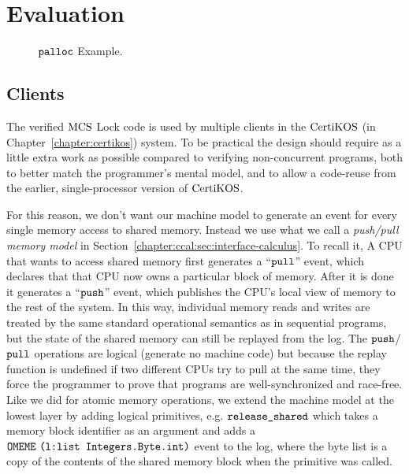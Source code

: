 
\section{Evaluation}
\label{chapter:mcslock:sec:evaluation}

\begin{figure}
\begin{minipage}{\linewidth}
\noindent
\begin{multicols}{2}


\end{multicols}
\end{minipage}
\caption{${\mathrm{\texttt{palloc}}}$ Example.}
\label{fig:chapter:mcslock:palloc-example}
\end{figure}

\subsection{Clients}

The verified $\mathrm{MCS}$ Lock code is used by multiple clients in the $\mathrm{CertiKOS}$ (in Chapter~\ref{chapter:certikos})
system. To be practical the design should require as a little extra work
as possible compared to verifying non-concurrent programs, both to
better match the programmer's mental model, and to allow a code-reuse
from the earlier, single-processor version of $\mathrm{CertiKOS}$.

For this reason, we don't want our machine model to generate an event
for every single memory access to shared memory. Instead we use what
we call a \emph{push/pull memory model} in Section~\ref{chapter:ccal:sec:interface-calculus}.
To recall it,
 A CPU that wants to access shared memory first generates a ``${\mathrm{\texttt{pull}}}$''
event, which declares that that CPU now owns a particular block of
memory. After it is done it generates a ``${\mathrm{\texttt{push}}}$'' event, which
publishes the CPU's local view of memory to the rest of the system. In
this way, individual memory reads and writes are treated by the same
standard operational semantics as in sequential programs, but the
state of the shared memory can still be replayed from the log.  The
${\mathrm{\texttt{push}}}$/${\mathrm{\texttt{pull}}}$ operations are logical (generate no machine code) but
because the replay function is undefined if two different CPUs try to
pull at the same time, they force the programmer to prove that
programs are well-synchronized and race-free. Like we did for atomic
memory operations, we extend the machine model at the lowest layer by
adding logical primitives, e.g. ${\mathrm{\texttt{release\_shared}}}$ which takes a
memory block identifier as an argument and adds a
${\mathrm{\texttt{OMEME}}}~{{\mathrm{\texttt{(l:list Integers.Byte.int)}}}}$ event to the log, where the byte list is a
copy of the contents of the shared memory block when the primitive was
called.

